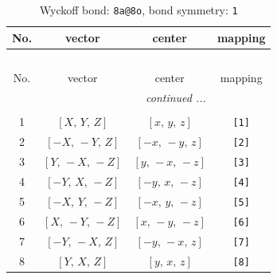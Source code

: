 \documentclass[fleqn,8pt]{jsarticle}
\begin{document}
\begin{longtable}{cccc}
\caption{Wyckoff bond: {\tt 8a@8o}, bond symmetry: {\tt 1}}
 \\
 \hline \hline
No. & vector & center & mapping \\ \hline \endfirsthead

\multicolumn{3}{l}{\tablename\ \thetable{}} \\
 \hline \hline
No. & vector & center & mapping \\ \hline \endhead

 \hline \hline
\multicolumn{3}{r}{\footnotesize\it continued ...} \\ \endfoot

 \hline \hline
\multicolumn{3}{r}{} \\ \endlastfoot

1 & $\left[ X,\, Y,\, Z \right]$ & $\left[ x,\, y,\, z \right]$ & {\tt [1]} \\ \hline
2 & $\left[ - X,\, - Y,\, Z \right]$ & $\left[ - x,\, - y,\, z \right]$ & {\tt [2]} \\ \hline
3 & $\left[ Y,\, - X,\, - Z \right]$ & $\left[ y,\, - x,\, - z \right]$ & {\tt [3]} \\ \hline
4 & $\left[ - Y,\, X,\, - Z \right]$ & $\left[ - y,\, x,\, - z \right]$ & {\tt [4]} \\ \hline
5 & $\left[ - X,\, Y,\, - Z \right]$ & $\left[ - x,\, y,\, - z \right]$ & {\tt [5]} \\ \hline
6 & $\left[ X,\, - Y,\, - Z \right]$ & $\left[ x,\, - y,\, - z \right]$ & {\tt [6]} \\ \hline
7 & $\left[ - Y,\, - X,\, Z \right]$ & $\left[ - y,\, - x,\, z \right]$ & {\tt [7]} \\ \hline
8 & $\left[ Y,\, X,\, Z \right]$ & $\left[ y,\, x,\, z \right]$ & {\tt [8]} \\
\end{longtable}
\end{document}
